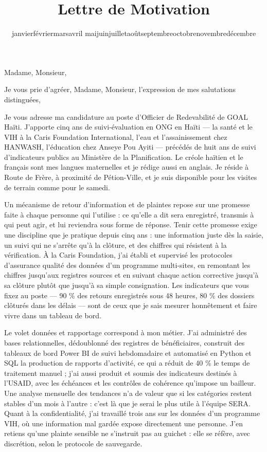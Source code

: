 \documentclass[10pt,a4paper,sans]{moderncv}
\title{Lettre de Motivation}
\renewcommand{\today}{\number\day\space\ifcase\month\or janvier\or février\or mars\or avril\or
mai\or juin\or juillet\or août\or septembre\or octobre\or novembre\or décembre\fi\space\number\year}
\begin{document}
\date{\today}
\opening{Madame, Monsieur,}
\closing{Je vous prie d'agréer, Madame, Monsieur, l'expression de mes salutations distinguées,}

\makelettertitle

Je vous adresse ma candidature au poste d'Officier de Redevabilité de GOAL Haïti. J'apporte cinq ans de suivi-évaluation en ONG en Haïti --- la santé et le VIH à la Caris Foundation International, l'eau et l'assainissement chez HANWASH, l'éducation chez Anseye Pou Ayiti --- précédés de huit ans de suivi d'indicateurs publics au Ministère de la Planification. Le créole haïtien et le français sont mes langues maternelles et je rédige aussi en anglais. Je réside à Route de Frère, à proximité de Pétion-Ville, et je suis disponible pour les visites de terrain comme pour le samedi.

Un mécanisme de retour d'information et de plaintes repose sur une promesse faite à chaque personne qui l'utilise : ce qu'elle a dit sera enregistré, transmis à qui peut agir, et lui reviendra sous forme de réponse. Tenir cette promesse exige une discipline que je pratique depuis cinq ans : une information juste dès la saisie, un suivi qui ne s'arrête qu'à la clôture, et des chiffres qui résistent à la vérification. À la Caris Foundation, j'ai établi et supervisé les protocoles d'assurance qualité des données d'un programme multi-sites, en remontant les chiffres jusqu'aux registres sources et en suivant chaque action corrective jusqu'à sa clôture plutôt que jusqu'à sa simple consignation. Les indicateurs que vous fixez au poste --- 90 \% des retours enregistrés sous 48 heures, 80 \% des dossiers clôturés dans les délais --- sont de ceux que je sais mesurer honnêtement et faire vivre dans un tableau de bord.

Le volet données et rapportage correspond à mon métier. J'ai administré des bases relationnelles, dédoublonné des registres de bénéficiaires, construit des tableaux de bord Power BI de suivi hebdomadaire et automatisé en Python et SQL la production de rapports d'activité, ce qui a réduit de 40 \% le temps de traitement manuel ; j'ai aussi produit et soumis des indicateurs destinés à l'USAID, avec les échéances et les contrôles de cohérence qu'impose un bailleur. Une analyse mensuelle des tendances n'a de valeur que si les catégories restent stables d'un mois à l'autre : c'est là que je serai le plus utile à l'équipe SERA. Quant à la confidentialité, j'ai travaillé trois ans sur les données d'un programme VIH, où une information mal gardée expose directement une personne. J'en retiens qu'une plainte sensible ne s'instruit pas au guichet : elle se réfère, avec discrétion, selon le protocole de sauvegarde.
\end{document}
